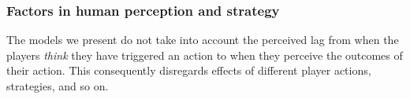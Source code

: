 \subsubsection{Factors in human perception and strategy}
The models we present do not take into account the perceived lag from when the players \textit{think} they have triggered an action to when they perceive the outcomes of their action. This consequently disregards effects of different player actions, strategies, and so on.



















